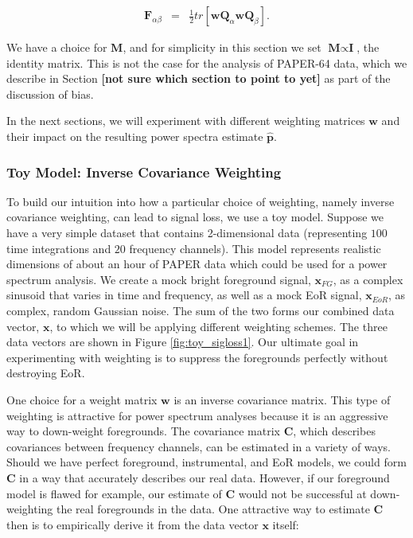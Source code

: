 \documentclass[preprint2,numberedappendix,tighten,twocolappendix]{aastex6}  %
\newcommand{\cc}[1]{{\color{purple} \textbf{[#1]}}}
\begin{document}
\begin{eqnarray}
\textbf{F}_{\alpha\beta} &=& \frac{1}{2}tr[\textbf{w}\textbf{Q}_{\alpha}\textbf{w}\textbf{Q}_{\beta}]. 
\end{eqnarray}

We have a choice for $\textbf{M}$, and for simplicity in this section we set $\textbf{M} \propto \textbf{I}$, the identity matrix. This is not the case for the analysis of PAPER-64 data, which we describe in Section \cc{not sure which section to point to yet} as part of the discussion of bias. 

In the next sections, we will experiment with different weighting matrices $\textbf{w}$ and their impact on the resulting power spectra estimate $\hat{\textbf{p}}$.

\subsubsection{Toy Model: Inverse Covariance Weighting}

To build our intuition into how a particular choice of weighting, namely inverse covariance weighting, can lead to signal loss, we use a toy model. Suppose we have a very simple dataset that contains 2-dimensional data (representing $100$ time integrations and $20$ frequency channels). This model represents realistic dimensions of about an hour of PAPER data which could be used for a power spectrum analysis. We create a mock bright foreground signal, $\textbf{x}_{FG}$, as a complex sinusoid that varies in time and frequency, as well as a mock EoR signal, $\textbf{x}_{EoR}$, as complex, random Gaussian noise. The sum of the two forms our combined data vector, $\textbf{x}$, to which we will be applying different weighting schemes. The three data vectors are shown in Figure \ref{fig:toy_sigloss1}. Our ultimate goal in experimenting with weighting is to suppress the foregrounds perfectly without destroying EoR.

One choice for a weight matrix $\textbf{w}$ is an inverse covariance matrix. This type of weighting is attractive for power spectrum analyses because it is an aggressive way to down-weight foregrounds. The covariance matrix $\textbf{C}$, which describes covariances between frequency channels, can be estimated in a variety of ways. Should we have perfect foreground, instrumental, and EoR models, we could form $\textbf{C}$ in a way that accurately describes our real data. However, if our foreground model is flawed for example, our estimate of $\textbf{C}$ would not be successful at down-weighting the real foregrounds in the data. One attractive way to estimate $\textbf{C}$ then is to empirically derive it from the data vector $\textbf{x}$ itself:
\end{document}

